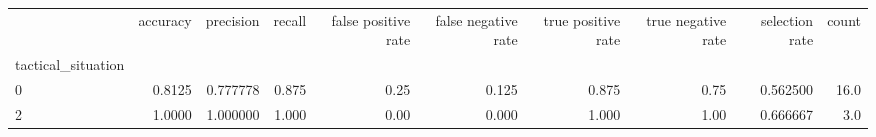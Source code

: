 \begin{tabular}{lrrrrrrrrr}
\toprule
{} &  accuracy &  precision &  recall &  false positive rate &  false negative rate &  true positive rate &  true negative rate &  selection rate &  count \\
tactical\_situation &           &            &         &                      &                      &                     &                     &                 &        \\
\midrule
0                  &    0.8125 &   0.777778 &   0.875 &                 0.25 &                0.125 &               0.875 &                0.75 &        0.562500 &   16.0 \\
2                  &    1.0000 &   1.000000 &   1.000 &                 0.00 &                0.000 &               1.000 &                1.00 &        0.666667 &    3.0 \\
\bottomrule
\end{tabular}
